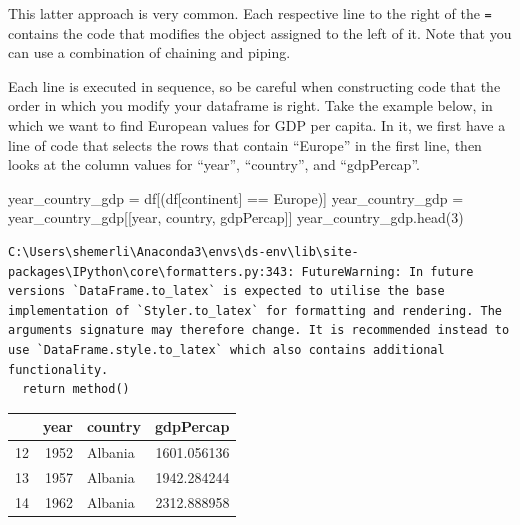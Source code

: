\documentclass[
  letterpaper,
  DIV=11,
  numbers=noendperiod]{scrreprt}
\newenvironment{Shaded}{\begin{snugshade}}{\end{snugshade}}
\newcommand{\DecValTok}[1]{\textcolor[rgb]{0.68,0.00,0.00}{#1}}
\newcommand{\NormalTok}[1]{\textcolor[rgb]{0.00,0.23,0.31}{#1}}
\newcommand{\OperatorTok}[1]{\textcolor[rgb]{0.37,0.37,0.37}{#1}}
\newcommand{\StringTok}[1]{\textcolor[rgb]{0.13,0.47,0.30}{#1}}
\begin{document}
This latter approach is very common. Each respective line to the right
of the \texttt{=} contains the code that modifies the object assigned to
the left of it. Note that you can use a combination of chaining and
piping.

Each line is executed in sequence, so be careful when constructing code
that the order in which you modify your dataframe is right. Take the
example below, in which we want to find European values for GDP per
capita. In it, we first have a line of code that selects the rows that
contain ``Europe'' in the first line, then looks at the column values
for ``year'', ``country'', and ``gdpPercap''.

\begin{Shaded}
\begin{Highlighting}[]
\NormalTok{year\_country\_gdp }\OperatorTok{=}\NormalTok{ df[(df[}\StringTok{\textquotesingle{}continent\textquotesingle{}}\NormalTok{] }\OperatorTok{==} \StringTok{\textquotesingle{}Europe\textquotesingle{}}\NormalTok{)]}
\NormalTok{year\_country\_gdp }\OperatorTok{=}\NormalTok{ year\_country\_gdp[[}\StringTok{\textquotesingle{}year\textquotesingle{}}\NormalTok{, }\StringTok{\textquotesingle{}country\textquotesingle{}}\NormalTok{, }\StringTok{\textquotesingle{}gdpPercap\textquotesingle{}}\NormalTok{]]}
\NormalTok{year\_country\_gdp.head(}\DecValTok{3}\NormalTok{)}
\end{Highlighting}
\end{Shaded}

\begin{verbatim}
C:\Users\shemerli\Anaconda3\envs\ds-env\lib\site-packages\IPython\core\formatters.py:343: FutureWarning: In future versions `DataFrame.to_latex` is expected to utilise the base implementation of `Styler.to_latex` for formatting and rendering. The arguments signature may therefore change. It is recommended instead to use `DataFrame.style.to_latex` which also contains additional functionality.
  return method()
\end{verbatim}

\begin{tabular}{lrlr}
\toprule
{} &  year &  country &    gdpPercap \\
\midrule
12 &  1952 &  Albania &  1601.056136 \\
13 &  1957 &  Albania &  1942.284244 \\
14 &  1962 &  Albania &  2312.888958 \\
\bottomrule
\end{tabular}
\end{document}
